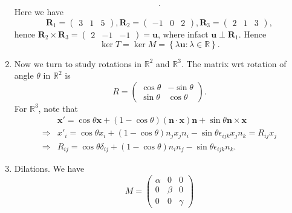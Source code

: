 \documentclass[10pt]{article}
\begin{document}
\begin{example}
\begin{enumerate}[(1)]
\[            .\]
            Here we have
            \[
                \mathbf{R}_1=\begin{pmatrix}
                    3&1&5
                \end{pmatrix},\mathbf{R}_2=\begin{pmatrix}
                    -1&0&2
                \end{pmatrix},\mathbf{R}_3=\begin{pmatrix}
                    2&1&3
                \end{pmatrix}
            ,\]
            hence $ \mathbf{R}_2 \times \mathbf{R}_3 = \begin{pmatrix}
                2&-1&-1
            \end{pmatrix}=\mathbf{u} $, where infact $ \mathbf{u} \perp \mathbf{R}_1 $. Hence 
            \[
                \ker T=\ker M=\left\{ \lambda \mathbf{u}:\lambda\in \mathbb{R}\right\}
            .\]
            \item Now we turn to study rotations in $ \mathbb{R}^{2} $ and $ \mathbb{R}^{3} $. The matrix wrt rotation of angle $ \theta $ in $ \mathbb{R}^{2} $ is
            \[
                R=\begin{pmatrix}
                    \cos \theta&-\sin \theta\\
                    \sin \theta&\cos \theta
                \end{pmatrix}
            .\]
            For $ \mathbb{R}^{3} $, note that 
            \[
                \begin{aligned}
                     &\mathbf{x}'=\cos \theta \mathbf{x}+(1-\cos \theta)(\mathbf{n}\cdot \mathbf{x})\mathbf{n}+\sin \theta \mathbf{n}\times \mathbf{x}\\
                     \Longrightarrow &x'_i= \cos \theta x_i+(1-\cos \theta)n_jx_jn_i-\sin \theta \epsilon_{ijk}x_j n_k=R_{ij}x_j\\
                     \Longrightarrow & R_{ij}=\cos \theta \delta_{ij}+(1-\cos \theta)n_in_j-\sin \theta \epsilon_{ijk} n_k.
                \end{aligned}
            \]
            \item Dilations. We have 
            \[
                M=\begin{pmatrix}
                    \alpha&0&0\\
                    0&\beta&0\\
                    0&0&\gamma
                \end{pmatrix}
\]
\end{enumerate}
\end{example}
\end{document}
